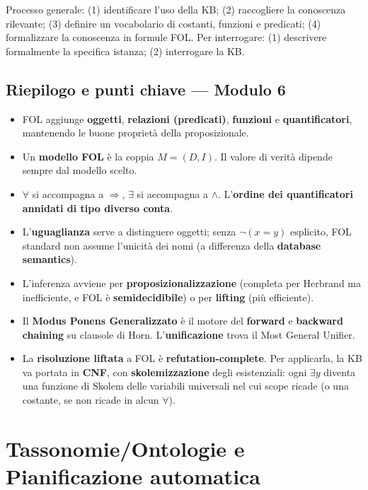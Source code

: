 \documentclass[11pt,a4paper]{report}
\begin{document}
Processo generale: (1) identificare l'uso della KB; (2) raccogliere la conoscenza rilevante; (3) definire un vocabolario di costanti, funzioni e predicati; (4) formalizzare la conoscenza in formule FOL. Per interrogare: (1) descrivere formalmente la specifica istanza; (2) interrogare la KB.

\section*{Riepilogo e punti chiave --- Modulo 6}

\begin{itemize}
  \item FOL aggiunge \textbf{oggetti}, \textbf{relazioni (predicati)}, \textbf{funzioni} e \textbf{quantificatori}, mantenendo le buone proprietà della proposizionale.
  \item Un \textbf{modello FOL} è la coppia $M=(D,I)$. Il valore di verità dipende sempre dal modello scelto.
  \item $\forall$ si accompagna a $\Rightarrow$, $\exists$ si accompagna a $\wedge$. L'\textbf{ordine dei quantificatori annidati di tipo diverso conta}.
  \item L'\textbf{uguaglianza} serve a distinguere oggetti; senza $\neg(x=y)$ esplicito, FOL standard non assume l'unicità dei nomi (a differenza della \textbf{database semantics}).
  \item L'inferenza avviene per \textbf{proposizionalizzazione} (completa per Herbrand ma inefficiente, e FOL è \textbf{semidecidibile}) o per \textbf{lifting} (più efficiente).
  \item Il \textbf{Modus Ponens Generalizzato} è il motore del \textbf{forward} e \textbf{backward chaining} su clausole di Horn. L'\textbf{unificazione} trova il Most General Unifier.
  \item La \textbf{risoluzione liftata} a FOL è \textbf{refutation-complete}. Per applicarla, la KB va portata in \textbf{CNF}, con \textbf{skolemizzazione} degli esistenziali: ogni $\exists y$ diventa una funzione di Skolem delle variabili universali nel cui scope ricade (o una costante, se non ricade in alcun $\forall$).
\end{itemize}

\chapter{Tassonomie/Ontologie e Pianificazione automatica}
\end{document}
